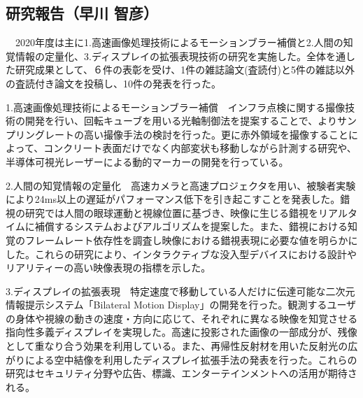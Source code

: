 \subsection{研究報告（早川 智彦）}

　2020年度は主に1.高速画像処理技術によるモーションブラー補償と2.人間の知覚情報の定量化、3.ディスプレイの拡張表現技術の研究を実施した。全体を通した研究成果として、６件の表彰を受け、1件の雑誌論文(査読付)と5件の雑誌以外の査読付き論文を投稿し、10件の発表を行った。

1.高速画像処理技術によるモーションブラー補償　インフラ点検に関する撮像技術の開発を行い、回転キューブを用いる光軸制御法を提案することで、よりサンプリングレートの高い撮像手法の検討を行った。更に赤外領域を撮像することによって、コンクリート表面だけでなく内部変状も移動しながら計測する研究や、半導体可視光レーザーによる動的マーカーの開発を行っている。

2.人間の知覚情報の定量化　高速カメラと高速プロジェクタを用い、被験者実験により24ms以上の遅延がパフォーマンス低下を引き起こすことを発表した。錯視の研究では人間の眼球運動と視線位置に基づき、映像に生じる錯視をリアルタイムに補償するシステムおよびアルゴリズムを提案した。また、錯視における知覚のフレームレート依存性を調査し映像における錯視表現に必要な値を明らかにした。これらの研究により、インタラクティブな没入型デバイスにおける設計やリアリティーの高い映像表現の指標を示した。

3.ディスプレイの拡張表現　特定速度で移動している人だけに伝達可能な二次元情報提示システム「Bilateral Motion Display」の開発を行った。観測するユーザの身体や視線の動きの速度・方向に応じて、それぞれに異なる映像を知覚させる指向性多義ディスプレイを実現した。高速に投影された画像の一部成分が、残像として重なり合う効果を利用している。また、再帰性反射材を用いた反射光の広がりによる空中結像を利用したディスプレイ拡張手法の発表を行った。これらの研究はセキュリティ分野や広告、標識、エンターテインメントへの活用が期待される。
